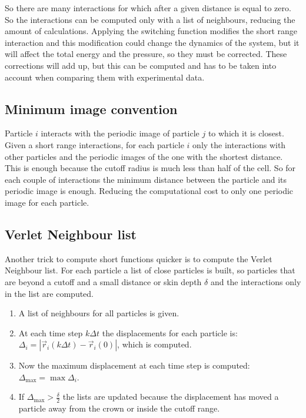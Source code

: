 	So there are many interactions for which after a given distance is equal to zero.
	So the interactions can be computed only with a list of neighbours, reducing the amount of calculations.
	Applying the switching function modifies the short range interaction and this modification could change the dynamics of the system, but it will affect the total energy and the pressure, so they must be corrected.
	These corrections will add up, but this can be computed and has to be taken into account when comparing them with experimental data.

	\subsection{Minimum image convention}
	Particle $i$ interacts with the periodic image of particle $j$ to which it is closest.
	Given a short range interactions, for each particle $i$ only the interactions with other particles and the periodic images of the one with the shortest distance.
	This is enough because the cutoff radius is much less than half of the cell.
	So for each couple of interactions the minimum distance between the particle and its periodic image is enough.
	Reducing the computational cost to only one periodic image for each particle.

	\subsection{Verlet Neighbour list}
	Another trick to compute short functions quicker is to compute the Verlet Neighbour list.
	For each particle a list of close particles is built, so particles that are beyond a cutoff and a small distance or skin depth $\delta$ and the interactions only in the list are computed.

	\begin{multicols}{2}
		\begin{enumerate}
			\item A list of neighbours for all particles is given.
			\item At each time step $k\Delta t$ the displacements for each particle is: $\Delta_i = |\vec{r}_i(k\Delta t) - \vec{r}_i(0)|$, which is computed.
			\item Now the maximum displacement at each time step is computed: $\Delta_{\max} = \max\Delta_i$.
			\item If $\Delta_{\max} > \frac{\delta}{2}$ the lists are updated because the displacement has moved a particle away from the crown or inside the cutoff range.
		\end{enumerate}
	\end{multicols}

